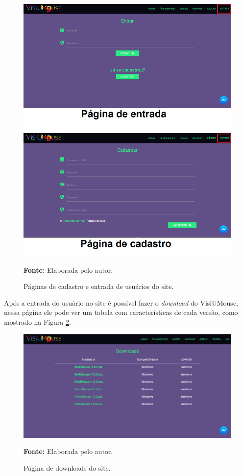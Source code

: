 \begin{figure}[htbp]
\caption{Páginas de cadastro e entrada de usuários do site.} 
\centering \includegraphics[scale=0.45]{img/site-entrar.png}

\textbf{Fonte:} Elaborada pelo autor.
\label{fig:site-entrar}
\end{figure}

Após a entrada do usuário no site é possível fazer o \textit{download} do VisiUMouse, nessa página ele pode ver um tabela com características de cada versão, como mostrado na Figura \ref{fig:site-download}.

\begin{figure}[htbp]
\caption{Página de downloads do site.} 
\centering \includegraphics[scale=0.45]{img/site-download.png}

\textbf{Fonte:} Elaborada pelo autor.
\label{fig:site-download}
\end{figure}


